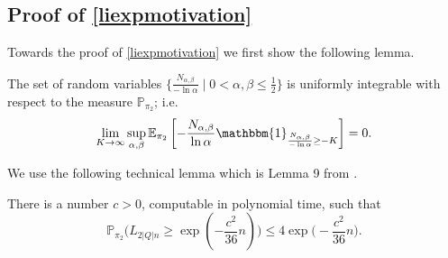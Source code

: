 \documentclass[a4paper,UKenglish,cleveref, autoref,mathscr]{lipics-v2019}
\newcommand{\EE}{\mathbb{E}}
\newcommand{\PP}{\mathbb{P}}
\newcommand{\1}{\mathbbm{1}}
\begin{document}
\subsection{Proof of \cref{liexpmotivation}} \label{app:liexpmotivation}

Towards the proof of \cref{liexpmotivation} we first show the following lemma.

\begin{lemma}\label{unifintegofN}
The set of random variables $\{\frac{N_{\alpha, \beta}}{-\ln \alpha}\mid 0 < \alpha, \beta \leq \frac12\}$ is uniformly integrable with respect to the measure $\PP_{\pi_2}$; i.e.
\begin{equation*}
\lim_{K \rightarrow \infty} \sup_{\alpha, \beta} \EE_{\pi_2} \left[ -\frac{N_{\alpha, \beta}}{\ln \alpha}\1_{\frac{N_{\alpha, \beta}}{-\ln \alpha} \geq - K} \right] = 0.
\end{equation*}
\end{lemma}
We use the following technical lemma which is Lemma 9 from \cite{kief16}.

\begin{lemma}\label{2016profilethm}
There is a number $c > 0$, computable in polynomial time, such that
\begin{equation*}
\PP_{\pi_2}\Big( L_{2|Q|n} \geq \exp( -\frac{c^2}{36} n ) \Big) \leq 4 \exp\Big( -\frac{c^2}{36} n \Big).
\end{equation*}
\end{lemma}
\end{document}
